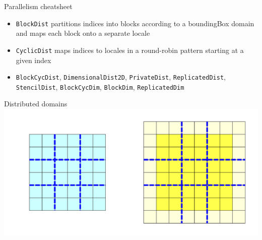 \documentclass[10pt,xcolor=pdftex,dvipsnames,table]{beamer}
\newcommand{\tc}{\textcolor}
\begin{document}
\begin{frame}{Parallelism cheatsheet}
{\begin{itemize}
      {\let\small\scriptsize
        \begin{itemize}\setlength{\itemsep}{0.1mm}
        \item \tc{Mahogany}{\texttt{BlockDist}} partitions indices into blocks according to a boundingBox
          domain and maps each block onto a separate locale
        \item \tc{Mahogany}{\texttt{CyclicDist}} maps indices to locales in a round-robin pattern
          starting at a given index
        \item \tc{Mahogany}{\texttt{BlockCycDist}}, \tc{Mahogany}{\texttt{DimensionalDist2D}},
          \tc{Mahogany}{\texttt{PrivateDist}}, \tc{Mahogany}{\texttt{ReplicatedDist}},
          \tc{Mahogany}{\texttt{StencilDist}}, \tc{Mahogany}{\texttt{BlockCycDim}},
          \tc{Mahogany}{\texttt{BlockDim}}, \tc{Mahogany}{\texttt{ReplicatedDim}}
      \end{itemize}}
  \end{itemize}}
\end{frame}



\begin{frame}{Distributed domains}
  \includegraphics[width=1.0\columnwidth]{domains.pdf}
\end{frame}



\end{document}
